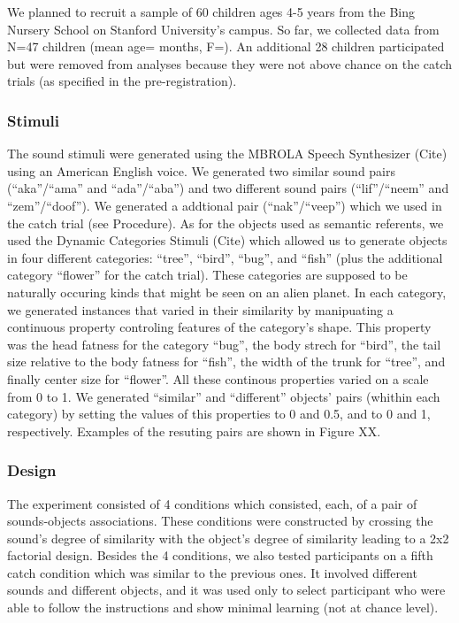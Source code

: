 \documentclass[10pt, letterpaper]{article}
\begin{document}
We planned to recruit a sample of 60 children ages 4-5 years from the
Bing Nursery School on Stanford University's campus. So far, we
collected data from N=47 children (mean age= months, F=). An additional
28 children participated but were removed from analyses because they
were not above chance on the catch trials (as specified in the
pre-registration).

\subsubsection{Stimuli}\label{stimuli}

The sound stimuli were generated using the MBROLA Speech Synthesizer
(Cite) using an American English voice. We generated two similar sound
pairs (``aka''/``ama'' and ``ada''/``aba'') and two different sound
pairs (``lif''/``neem'' and ``zem''/``doof''). We generated a addtional
pair (``nak''/``veep'') which we used in the catch trial (see
Procedure). As for the objects used as semantic referents, we used the
Dynamic Categories Stimuli (Cite) which allowed us to generate objects
in four different categories: ``tree'', ``bird'', ``bug'', and ``fish''
(plus the additional category ``flower'' for the catch trial). These
categories are supposed to be naturally occuring kinds that might be
seen on an alien planet. In each category, we generated instances that
varied in their similarity by manipuating a continuous property
controling features of the category's shape. This property was the head
fatness for the category ``bug'', the body strech for ``bird'', the tail
size relative to the body fatness for ``fish'', the width of the trunk
for ``tree'', and finally center size for ``flower''. All these
continous properties varied on a scale from 0 to 1. We generated
``similar'' and ``different'' objects' pairs (whithin each category) by
setting the values of this properties to 0 and 0.5, and to 0 and 1,
respectively. Examples of the resuting pairs are shown in Figure XX.

\subsubsection{Design}\label{design}

The experiment consisted of 4 conditions which consisted, each, of a
pair of sounds-objects associations. These conditions were constructed
by crossing the sound's degree of similarity with the object's degree of
similarity leading to a 2x2 factorial design. Besides the 4 conditions,
we also tested participants on a fifth catch condition which was similar
to the previous ones. It involved different sounds and different
objects, and it was used only to select participant who were able to
follow the instructions and show minimal learning (not at chance level).
\end{document}
